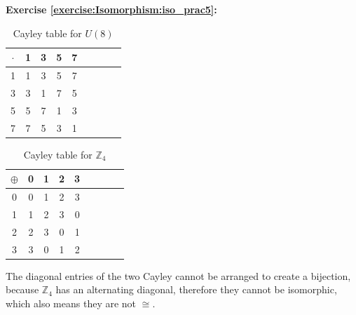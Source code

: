 \noindent\textbf{Exercise \ref{exercise:Isomorphism:iso_prac5}:}
\begin{multicols}{2}
\begin{table}[H]
\caption{Cayley table for $U(8)$}
{\small
\begin{center}
\begin{tabular}{c|cccccccc}
$\cdot$ & 1 & 3 & 5 & 7  \\
\hline
1        & 1 & 3 & 5 & 7  \\
3       & 3 & 1 & 7 & 5  \\
5       & 5 & 7 & 1 & 3 \\
7       & 7 & 5 & 3 & 1 \\
\end{tabular}
\end{center}
}
\end{table}

\begin{table}[H]
\caption{Cayley table for ${\mathbb Z}_4$}
{\small
\begin{center}
\begin{tabular}{c|cccccccc}
$\oplus$ & 0 & 1 & 2 & 3  \\
\hline
0        & 0 & 1 & 2 & 3  \\
1       & 1 & 2 & 3 & 0  \\
2       & 2 & 3 & 0 & 1 \\
3       & 3 & 0 & 1 & 2 \\
\end{tabular}
\end{center}
}
\end{table}

\end{multicols}
\noindent The diagonal entries of the two Cayley cannot be arranged to create a bijection, because ${\mathbb Z}_4$ has an alternating diagonal, therefore they cannot be isomorphic, which also means they are not $\cong$.
\\
\\

